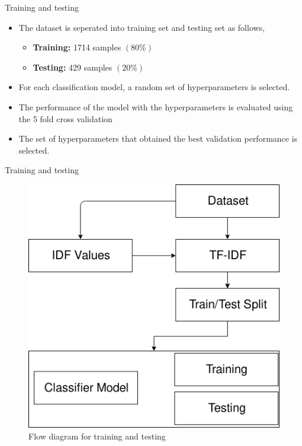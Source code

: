\documentclass[12pt]{beamer}
\begin{document}
\begin{frame}{Training and testing}
    \begin{itemize}
        \item The dataset is seperated into training set and testing set as follows,
        \begin{itemize}
            \item \textbf{Training:} 1714 samples $(80\%)$
            \item \textbf{Testing:} 429 samples $(20\%)$
        \end{itemize}
        \item For each classification model, a random set of hyperparameters is selected.
        \item The performance of the model with the hyperparameters is evaluated using the 5 fold cross validation
        \item The set of hyperparameters that obtained the best validation performance is selected.
    \end{itemize}
\end{frame}

\begin{frame}{Training and testing}
    \begin{figure}[h]
        \includegraphics[scale=0.4]{images/training.png}
        \caption{Flow diagram for training and testing}
        \label{fig:training_testing}
    \end{figure}
\end{frame}
\end{document}
